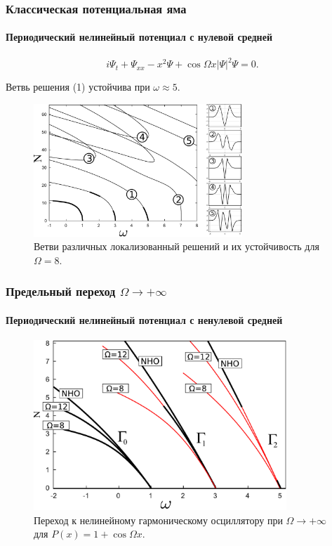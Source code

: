 \documentclass [10pt] {beamer}
\begin{document}
\begin{frame}
	\frametitle{Классическая потенциальная яма}
	\framesubtitle{Периодический нелинейный потенциал с нулевой средней}
	
	\begin{equation}
		i \Psi_t + \Psi_{xx} - x^2 \Psi + \cos \Omega x |\Psi|^2 \Psi = 0.
	\end{equation}

	Ветвь решения {\color{ceruleanblue} (1)} устойчива при $\omega \approx 5$.

	\begin{figure}
		\includegraphics[width=0.7\textwidth]{pic/solution_branches_zero_mean.pdf}
		\caption{Ветви различных локализованный решений и их устойчивость для $\Omega = 8$.}
		\label{pic:branches_zero_mean}
	\end{figure}	
	
\end{frame}

\begin{frame}
	\frametitle{Предельный переход $\Omega \to +\infty$}
	\framesubtitle{Периодический нелинейный потенциал с ненулевой средней}
	
	\begin{figure}
		\includegraphics[width=0.85\textwidth]{pic/nonlinear_oscillator_limit.pdf}
		\caption{Переход к нелинейному гармоническому осциллятору при $\Omega \to +\infty$ для $P(x) = 1 + \cos \Omega x$.}
		\label{pic:nonlinear_limit}
	\end{figure}	
\end{frame}
\end{document}
